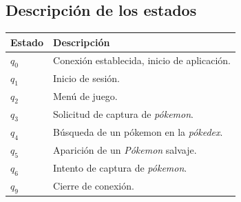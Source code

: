 \documentclass[12pt]{article}
\begin{document}
\subsection{Descripción de los estados}
\begin{center}
\begin{tabular}{|l|p{9cm}|}
  \hline
  Estado & Descripción \\
  \hline
  $q_0$ & Conexión establecida, inicio de aplicación. \\ \hline
  $q_1$ & Inicio de sesión. \\ \hline
  $q_2$ & Menú de juego. \\ \hline
  $q_3$ & Solicitud de captura de \textit{pókemon}. \\ \hline
  $q_4$ & Búsqueda de un pókemon en la \textit{pókedex}. \\ \hline
  $q_5$ & Aparición de un \textit{Pókemon} salvaje. \\ \hline
  $q_6$ & Intento de captura de \textit{pókemon}.\\ \hline
  $q_9$ & Cierre de conexión. \\
  \hline
\end{tabular}
\end{center}
\newpage
\end{document}
